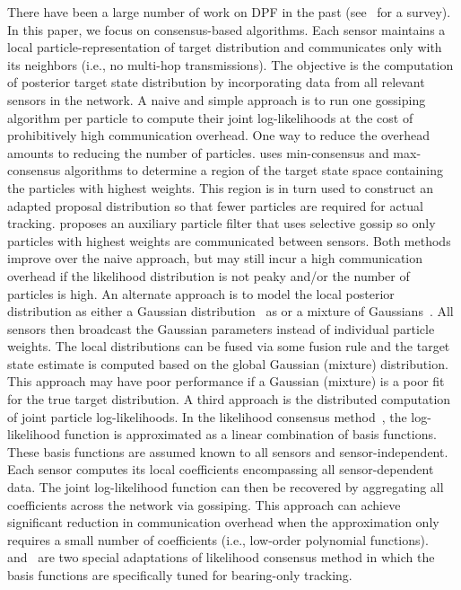 \documentclass[10pt,letterpaper,final]{article}
\begin{document}
There have been a large number of work on DPF in the past (see~\cite{Hlinka2012Survey} for a survey). In this paper, we focus on consensus-based algorithms. Each sensor maintains a local particle-representation of target distribution and communicates only with its neighbors (i.e., no multi-hop transmissions). The objective is the computation of posterior target state distribution by incorporating data from all relevant sensors in the network. A naive and simple approach is to run one gossiping algorithm per particle to compute their joint log-likelihoods at the cost of prohibitively high communication overhead. One way to reduce the overhead amounts to reducing the number of particles. \cite{Farahmand2011} uses min-consensus and max-consensus algorithms to determine a region of the target state space containing the particles with highest weights. This region is in turn used to construct an adapted proposal distribution so that fewer particles are required for actual tracking. \cite{Ustebay2011} proposes an auxiliary particle filter that uses selective gossip so only particles with highest weights are communicated between sensors. Both methods improve over the naive approach, but may still incur a high communication overhead if the likelihood distribution is not peaky and/or the number of particles is high. An alternate approach is to model the local posterior distribution as either a Gaussian distribution~\cite{Gu2008} as or a mixture of Gaussians~\cite{Sheng2005}. All sensors then broadcast the Gaussian parameters instead of individual particle weights. The local distributions can be fused via some fusion rule and the target state estimate is computed based on the global Gaussian (mixture) distribution. This approach may have poor performance if a Gaussian (mixture) is a poor fit for the true target distribution. A third approach is the distributed computation of joint particle log-likelihoods. In the likelihood consensus method~\cite{Hlinka2012}, the log-likelihood function is approximated as a linear combination of basis functions. These basis functions are assumed known to all sensors and sensor-independent. Each sensor computes its local coefficients encompassing all sensor-dependent data. The joint log-likelihood function can then be recovered by aggregating all coefficients across the network via gossiping. This approach can achieve significant reduction in communication overhead when the approximation only requires a small number of coefficients (i.e., low-order polynomial functions). \cite{Mohammadi2012} and~\cite{Yu2016} are two special adaptations of likelihood consensus method in which the basis functions are specifically tuned for bearing-only tracking.
\end{document}
